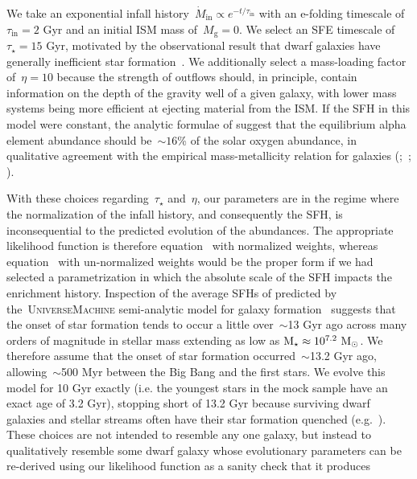 \documentclass[ms.tex]{subfiles}
\begin{document}
We take an exponential infall history~$\dot{M}_\text{in} \propto e^{-t /
\tau_\text{in}}$ with an e-folding timescale of~$\tau_\text{in} = 2$ Gyr and an
initial ISM mass of~$M_\text{g} = 0$.
We select an SFE timescale of~$\tau_\star = 15$ Gyr, motivated by the
observational result that dwarf galaxies have generally inefficient star
formation~\citep[e.g.][]{Hudson2015}.
We additionally select a mass-loading factor of~$\eta = 10$ because the
strength of outflows should, in principle, contain information on the depth of
the gravity well of a given galaxy, with lower mass systems being more
efficient at ejecting material from the ISM.
If the SFH in this model were constant, the analytic formulae of
\citet{Weinberg2017} suggest that the equilibrium alpha element abundance
should be~$\sim16$\% of the solar oxygen abundance, in qualitative agreement
with the empirical mass-metallicity relation for galaxies
(\citealp{Tremonti2004, Gallazzi2005};~\citealp*{Zahid2011};
\citealp{Andrews2013, Kirby2013, Zahid2014}).
\par
With these choices regarding~$\tau_\star$ and~$\eta$, our parameters are in
the regime where the normalization of the infall history, and consequently the
SFH, is inconsequential to the predicted evolution of the abundances.
The appropriate likelihood function is therefore equation~
with normalized weights, whereas equation~ with
un-normalized weights would be the proper form if we had selected a
parametrization in which the absolute scale of the SFH impacts the enrichment
history.
Inspection of the average SFHs of predicted by the~\textsc{UniverseMachine}
semi-analytic model for galaxy formation~\citep{Behroozi2019} suggests that the
onset of star formation tends to occur a little over~$\sim$13 Gyr ago across
many orders of magnitude in stellar mass extending as low as
$\text{M}_\star \approx 10^{7.2}~\text{M}_\odot$.
We therefore assume that the onset of star formation occurred~$\sim$13.2 Gyr
ago, allowing~$\sim$500 Myr between the Big Bang and the first stars.
We evolve this model for 10 Gyr exactly (i.e. the youngest stars in the mock
sample have an exact age of 3.2 Gyr), stopping short of 13.2 Gyr because
surviving dwarf galaxies and stellar streams often have their star formation
quenched (e.g.~\citealp{Monelli2010a, Monelli2010b, Sohn2013, Weisz2014a,
Weisz2014b, Weisz2015}).
These choices are not intended to resemble any one galaxy, but instead to
qualitatively resemble some dwarf galaxy whose evolutionary parameters can
be re-derived using our likelihood function as a sanity check that it produces
\end{document}
